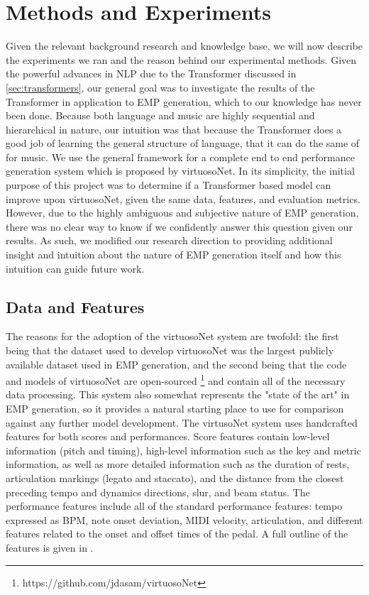 \chapter{Methods and Experiments}\label{ch:ch4}
Given the relevant background research and knowledge base, we will now describe the experiments we ran and the reason behind our experimental methods. Given the powerful advances in NLP due to the Transformer discussed in \ref{sec:transformers}, our general goal was to investigate the results of the Transformer in application to EMP generation, which to our knowledge has never been done. Because both language and music are highly sequential and hierarchical in nature, our intuition was that because the Transformer does a good job of learning the general structure of language, that it can do the same of for music. We use the general framework for a complete end to end performance generation system which is proposed by virtuosoNet. In its simplicity, the initial purpose of this project was to determine if a Transformer based model can improve upon virtuosoNet, given the same data, features, and evaluation metrics. However, due to the highly ambiguous and subjective nature of EMP generation, there was no clear way to know if we confidently answer this question given our results. As such, we modified our research direction to providing additional insight and intuition about the nature of EMP generation itself and how this intuition can guide future work. 

\section{Data and Features}
The reasons for the adoption of the virtuosoNet system are twofold: the first being that the dataset used to develop virtuosoNet was the largest publicly available dataset used in EMP generation, and the second being that the code and models of virtuosoNet are open-sourced \footnote{https://github.com/jdasam/virtuosoNet} and contain all of the necessary data processing. This system also somewhat represents the "state of the art" in EMP generation, so it provides a natural starting place to use for comparison against any further model development. The virtusoNet system uses handcrafted features for both scores and performances. Score features contain low-level information (pitch and timing), high-level information such as the key and metric information, as well as more detailed information such as the duration of rests, articulation markings (legato and staccato), and the distance from the closest preceding tempo and dynamics directions, slur, and beam status. The performance features include all of the standard performance features: tempo expressed as BPM, note onset deviation, MIDI velocity, articulation, and different features related to the onset and offset times of the pedal. A full outline of the features is given in \cite{jeong2019score}. 

